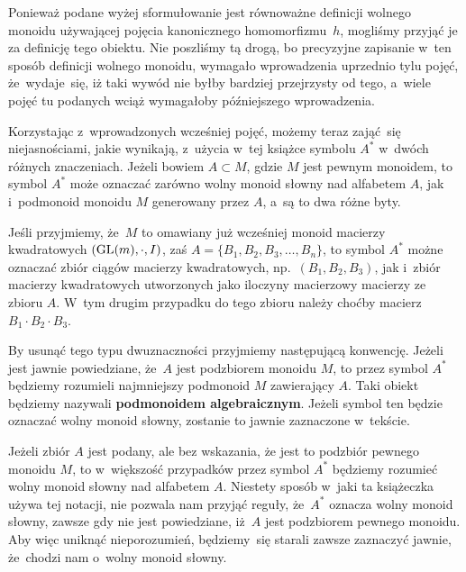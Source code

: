 \documentclass[a4paper,11pt]{article}
\begin{document}
Ponieważ podane wyżej sformułowanie jest równoważne definicji wolnego
monoidu używającej pojęcia kanonicznego homomorfizmu~$h$, mogliśmy
przyjąć je za definicję tego obiektu. Nie poszliśmy tą drogą, bo
precyzyjne zapisanie w~ten sposób definicji wolnego monoidu, wymagało
wprowadzenia uprzednio tylu pojęć, że~wydaje~się, iż taki wywód nie
byłby bardziej przejrzysty od tego, a~wiele pojęć tu podanych wciąż
wymagałoby późniejszego wprowadzenia.

\vspace{\spaceFour}





\start {} Korzystając z~wprowadzonych wcześniej pojęć, możemy
teraz zająć~się niejasnościami, jakie wynikają, z~użycia w~tej książce
symbolu $A^{ * }$ w~dwóch różnych znaczeniach. Jeżeli bowiem
$A \subset M$, gdzie $M$ jest pewnym monoidem, to symbol $A^{ * }$
może oznaczać zarówno wolny monoid słowny nad alfabetem $A$, jak
i~podmonoid monoidu $M$ generowany przez $A$, a~są to dwa różne byty.

Jeśli przyjmiemy, że~$M$ to omawiany już wcześniej monoid macierzy
kwadratowych $( \mathrm{GL}( m ), \cdot, I )$, zaś
$A = \{ B_{ 1 }, B_{ 2 }, B_{ 3 }, \ldots, B_{ n } \}$, to symbol
$A^{ * }$ możne oznaczać zbiór ciągów macierzy kwadratowych,
np.~$( B_{ 1 }, B_{ 2 }, B_{ 3 } )$, jak i~zbiór macierzy kwadratowych
utworzonych jako iloczyny macierzowy macierzy ze zbioru $A$. W~tym
drugim przypadku do tego zbioru należy choćby macierz
$B_{ 1 } \cdot B_{ 2 } \cdot B_{ 3 }$.

By usunąć tego typu dwuznaczności przyjmiemy następującą konwencję.
Jeżeli jest jawnie powiedziane, że~$A$ jest podzbiorem monoidu $M$, to
przez symbol $A^{ * }$ będziemy rozumieli najmniejszy podmonoid $M$
zawierający $A$. Taki obiekt będziemy nazywali \textbf{podmonoidem
  algebraicznym}. Jeżeli symbol ten będzie oznaczać wolny monoid słowny,
zostanie to jawnie zaznaczone w~tekście.

Jeżeli zbiór $A$ jest podany, ale bez wskazania, że jest to podzbiór
pewnego monoidu $M$, to w~większość przypadków przez symbol $A^{ * }$
będziemy rozumieć wolny monoid słowny nad alfabetem $A$. Niestety sposób
w~jaki ta książeczka używa tej notacji, nie pozwala nam przyjąć reguły,
że~$A^{ * }$ oznacza wolny monoid słowny, zawsze gdy nie jest powiedziane,
iż~$A$ jest podzbiorem pewnego monoidu. Aby więc uniknąć nieporozumień,
będziemy~się starali zawsze zaznaczyć jawnie, że~chodzi nam o~wolny monoid
słowny.
\end{document}
